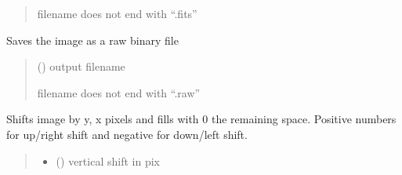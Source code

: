 \documentclass[letterpaper,10pt,english]{sphinxmanual}
\begin{document}
\begin{fulllineitems}
\begin{fulllineitems}
\begin{quote}
\begin{description}
\sphinxAtStartPar
{} \textendash{} filename does not end with “.fits”

\end{description}\end{quote}

\end{fulllineitems}


\begin{fulllineitems}
\label{\detokenize{micropolarray:micropolarray.image.Image.save_as_raw}}
\pysigstartsignatures
{}
\pysigstopsignatures
\sphinxAtStartPar
Saves the image as a raw binary file
\begin{quote}\begin{description}
\sphinxAtStartPar
{} () \textendash{} output filename

\sphinxAtStartPar
{} \textendash{} filename does not end with “.raw”

\end{description}\end{quote}

\end{fulllineitems}


\begin{fulllineitems}
\label{\detokenize{micropolarray:micropolarray.image.Image.shift}}
\pysigstartsignatures
{}
\pysigstopsignatures
\sphinxAtStartPar
Shifts image by y, x pixels and fills with 0 the remaining space. Positive numbers for up/right shift and negative for down/left shift.
\begin{quote}\begin{description}
\begin{itemize}
\item {} 
\sphinxAtStartPar
{} () \textendash{} vertical shift in pix


\end{itemize}
\end{description}
\end{quote}
\end{fulllineitems}
\end{fulllineitems}
\end{document}
